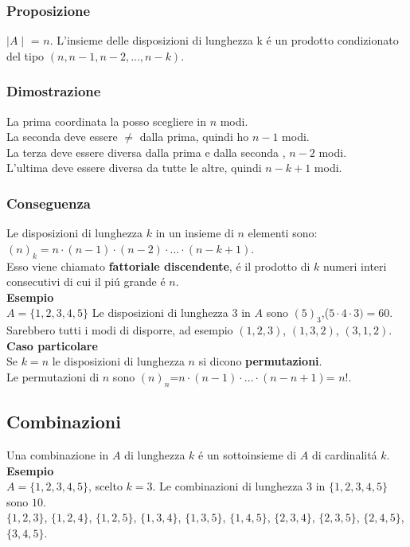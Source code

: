 \documentclass[11pt]{article}
\begin{document}
            \subsubsection{Proposizione}
            $\mid A \mid$ = $n$. L'insieme delle disposizioni di lunghezza k \'e un prodotto condizionato del tipo $(n,n-1,n-2,...,n-k)$.
            \subsubsection{Dimostrazione}
            La prima coordinata la posso scegliere in $n$ modi.\\
            La seconda deve essere $\neq$ dalla prima, quindi ho $n-1$ modi.\\
            La terza deve essere diversa dalla prima e dalla seconda , $n-2$ modi.\\
            L'ultima deve essere diversa da tutte le altre, quindi $n-k+1$ modi.
            \subsubsection{Conseguenza}
            Le disposizioni di lunghezza $k$ in un insieme di $n$ elementi sono:\\
            $(n)_k = n\cdot(n-1)\cdot(n-2)\cdot...\cdot(n-k+1)$.\\
            Esso viene chiamato \textbf{fattoriale discendente}, \'e il prodotto di $k$ numeri interi consecutivi di cui il pi\'u grande \'e $n$.\\
            \textbf{Esempio}\\
            $A=\{1,2,3,4,5\}$ Le disposizioni di lunghezza $3$ in $A$ sono $(5)_3$,($5\cdot4\cdot3)=60$. Sarebbero tutti i modi di disporre, ad esempio $(1,2,3)$, $(1,3,2)$, $(3,1,2)$.\\
            \textbf{Caso particolare}\\
            Se $k=n$ le disposizioni di lunghezza $n$ si dicono \textbf{permutazioni}.\\
            Le permutazioni di $n$ sono $(n)_n$=$n\cdot(n-1)\cdot...\cdot(n-n+1)$= $n!$.
            \subsection{Combinazioni}
            Una combinazione in $A$ di lunghezza $k$ \'e un sottoinsieme di $A$ di cardinalit\'a $k$.\\
            \textbf{Esempio}\\
            $A=\{1,2,3,4,5\}$, scelto $k=3$. Le combinazioni di lunghezza 3 in $\{1,2,3,4,5\}$ sono $10$.\\
            $\{1,2,3\}$, $\{1,2,4\}$, $\{1,2,5\}$, $\{1,3,4\}$, $\{1,3,5\}$, $\{1,4,5\}$, $\{2,3,4\}$, $\{2,3,5\}$, $\{2,4,5\}$, $\{3,4,5\}$.
\end{document}
